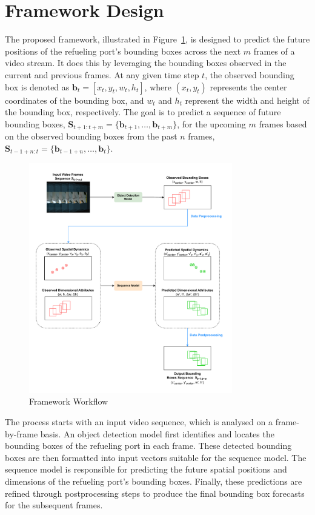 \documentclass[12pt,oneside]{book} %
\begin{document}
\section{Framework Design}
The proposed framework, illustrated in Figure~\ref{fig:framework-workflow}, is
designed to predict the future positions of the refueling port’s bounding boxes
across the next \(m\) frames of a video stream. It does this by leveraging the
bounding boxes observed in the current and previous frames. At any given time
step \(t\), the observed bounding box is denoted as \(\mathbf{b}_t = [x_t, y_t,
w_t, h_t]\), where \((x_t, y_t)\) represents the center coordinates of the
bounding box, and \(w_t\) and \(h_t\) represent the width and height of the
bounding box, respectively. The goal is to predict a sequence of future
bounding boxes, \(\mathbf{S}_{t+1:t+m} = \{\mathbf{b}_{t+1}, \dots,
\mathbf{b}_{t+m}\}\), for the upcoming \(m\) frames based on the observed
bounding boxes from the past \(n\) frames, \(\mathbf{S}_{t-1+n:t} =
\{\mathbf{b}_{t-1+n}, \dots, \mathbf{b}_{t}\}\). 

\begin{figure}[H]
    \centering
    \includegraphics[width=0.79\textwidth]{figures/FrameworkWorkflow.drawio.pdf}
    \caption{Framework Workflow}\label{fig:framework-workflow}
\end{figure}

The process starts with an input video sequence, which is analysed on a
frame-by-frame basis. An object detection model first identifies and locates
the bounding boxes of the refueling port in each frame. These detected bounding
boxes are then formatted into input vectors suitable for the sequence model.
The sequence model is responsible for predicting the future spatial positions
and dimensions of the refueling port’s bounding boxes. Finally, these
predictions are refined through postprocessing steps to produce the final
bounding box forecasts for the subsequent frames.
\end{document}
